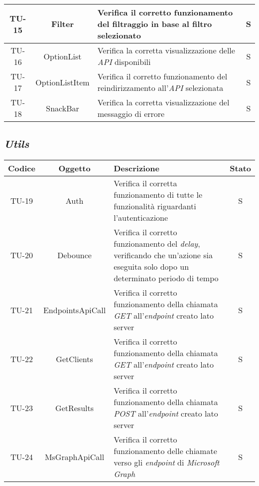\begin{center}
\begin{longtable}{|c|c|p{}|c|}
  \hline
  TU-15 &Filter &Verifica il corretto funzionamento del filtraggio in base al filtro selezionato &S \\
  \hline
  TU-16 &OptionList &Verifica la corretta visualizzazione delle \textit{API} disponibili &S \\
  \hline
  TU-17 &OptionListItem &Verifica il corretto funzionamento del reindirizzamento all'\textit{API} selezionata &S \\
  \hline
  TU-18 &SnackBar &Verifica la corretta visualizzazione del messaggio di errore &S \\
  \hline
\end{longtable}
\end{center}

\subsection*{\emph{Utils}}\label{subsec:test-unita-utils}


\begin{center}
  \label{tab:test-unita-utils}
  \begin{longtable}{|c|c|p{}|c|}
  \hline
  \textbf{Codice} & \textbf{Oggetto} & \textbf{Descrizione} & \textbf{Stato}\\
  \hline
  TU-19 &Auth &Verifica il corretta funzionamento di tutte le funzionalità riguardanti l'autenticazione & S \\
  \hline
  TU-20 &Debounce &Verifica il corretto funzionamento del \textit{delay}, verificando che un'azione sia eseguita solo dopo un determinato periodo di tempo &S \\
  \hline
  TU-21 &EndpointsApiCall &Verifica il corretto funzionamento della chiamata \textit{GET} all'\textit{endpoint} creato lato server &S \\
  \hline
  TU-22 &GetClients &Verifica il corretto funzionamento della chiamata \textit{GET} all'\textit{endpoint} creato lato server  &S \\
  \hline
  TU-23 &GetResults &Verifica il corretto funzionamento della chiamata \textit{POST} all'\textit{endpoint} creato lato server &S \\
  \hline
  TU-24 &MsGraphApiCall &Verifica il corretto funzionamento delle chiamate verso gli \textit{endpoint} di \textit{Microsoft Graph} &S \\
  \hline
\end{longtable}
\end{center}


